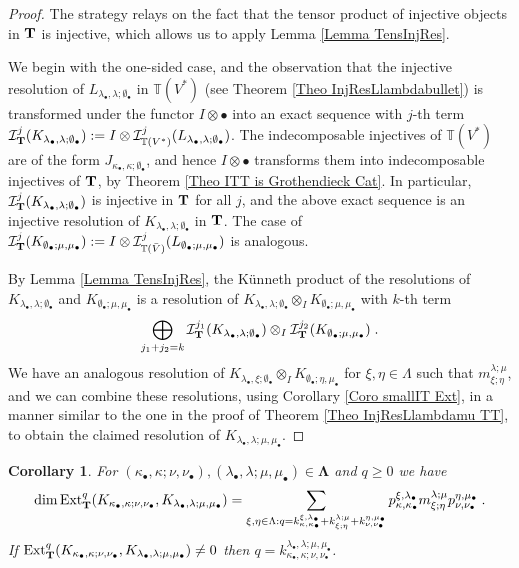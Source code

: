\documentclass[12pt]{article}
\def\TT {{\mathbb T}}     %
\def\mc {\mathcal}
\newtheorem{coro}[theorem]{Corollary}
\begin{document}
\begin{proof}
The strategy relays on the fact that the tensor product of injective objects in ${\bf T}$ is injective, which allows us to apply Lemma \ref{Lemma TensInjRes}.

We begin with the one-sided case, and the observation that the injective resolution of $L_{\lambda_\bullet,\lambda;\emptyset_\bullet}$ in $\TT(V^*)$ (see Theorem \ref{Theo InjResLlambdabullet}) is transformed under the functor $I\otimes\bullet$ into an exact sequence with $j$-th term $\mc I_{\bf T}^{j}(K_{\lambda_\bullet,\lambda;\emptyset_\bullet}):=I\otimes \mc I_{\TT(V^*)}^{j}(L_{\lambda_\bullet,\lambda;\emptyset_\bullet})$. The indecomposable injectives of $\TT(V^*)$ are of the form $J_{\kappa_\bullet,\kappa;\emptyset_\bullet}$, and hence $I\otimes\bullet$ transforms them into indecomposable injectives of ${\bf T}$, by Theorem \ref{Theo ITT is Grothendieck Cat}. In particular, $\mc I_{\bf T}^{j}(K_{\lambda_\bullet,\lambda;\emptyset_\bullet})$ is injective in ${\bf T}$ for all $j$, and the above exact sequence is an injective resolution of $K_{\lambda_\bullet,\lambda;\emptyset_\bullet}$ in ${\bf T}$. The case of $\mc I_{\bf T}^{j}(K_{\emptyset_\bullet;\mu,\mu_\bullet}):=I\otimes \mc I_{\TT(\bar V)}^{j}(L_{\emptyset_\bullet;\mu,\mu_\bullet})$ is analogous.

By Lemma \ref{Lemma TensInjRes}, the K\"unneth product of the resolutions of $K_{\lambda_\bullet,\lambda;\emptyset_\bullet}$ and $K_{\emptyset_\bullet;\mu,\mu_\bullet}$ is a resolution of $K_{\lambda_\bullet,\lambda;\emptyset_\bullet}\otimes_I K_{\emptyset_\bullet;\mu,\mu_\bullet}$ with $k$-th term
$$
\bigoplus\limits_{j_1+j_2=k} \mc I_{\bf T}^{j_1}(K_{\lambda_\bullet,\lambda;\emptyset_\bullet})\otimes_I\mc I_{\bf T}^{j_2}(K_{\emptyset_\bullet;\mu,\mu_\bullet}) \;.
$$
We have an analogous resolution of $K_{\lambda_\bullet,\xi;\emptyset_\bullet}\otimes_I K_{\emptyset_\bullet;\eta,\mu_\bullet}$ for $\xi,\eta\in\Lambda$ such that $m^{\lambda;\mu}_{\xi;\eta}$, and we can combine these resolutions, using Corollary \ref{Coro smallIT Ext}, in a manner similar to the one in the proof of Theorem \ref{Theo InjResLlambdamu TT}, to obtain the claimed resolution of $K_{\lambda_\bullet,\lambda;\mu,\mu_\bullet}$.
\end{proof}


\begin{coro}\label{Coro dimExt Tkk Tll}
For $(\kappa_\bullet,\kappa;\nu,\nu_\bullet),(\lambda_\bullet,\lambda;\mu,\mu_\bullet)\in\bm\Lambda$ and $q\geq0$ we have
$$
\dim {\rm Ext}_{{\bf T}}^q (K_{\kappa_\bullet,\kappa;\nu,\nu_\bullet},K_{\lambda_\bullet,\lambda;\mu,\mu_\bullet}) = \sum\limits_{\xi,\eta\in\Lambda:q=k^{\xi,\lambda_\bullet}_{\kappa,\kappa_\bullet} +k^{\lambda;\mu}_{\xi;\eta} +k^{\eta,\mu_\bullet}_{\nu,\nu_\bullet}} p^{\xi,\lambda_\bullet}_{\kappa,\kappa_\bullet} m^{\lambda;\mu}_{\xi;\eta} p^{\eta,\mu_\bullet}_{\nu,\nu_\bullet} \;.
$$
If ${\rm Ext}_{{\bf T}}^q (K_{\kappa_\bullet,\kappa;\nu,\nu_\bullet},K_{\lambda_\bullet,\lambda;\mu,\mu_\bullet})\ne 0$ then $q=k^{\lambda_\bullet,\lambda;\mu,\mu_\bullet}_{\kappa_\bullet,\kappa;\nu,\nu_\bullet}$.
\end{coro}
\end{document}
